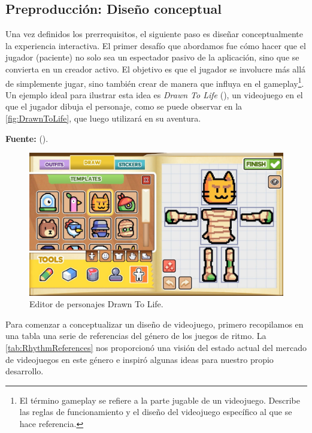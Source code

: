 \subsection{Preproducción: Diseño conceptual}

Una vez definidos los prerrequisitos, el siguiente paso es diseñar conceptualmente la experiencia interactiva. El primer desafío que abordamos fue cómo hacer que el jugador (paciente) no solo sea un espectador pasivo de la aplicación, sino que se convierta en un creador activo. El objetivo es que el jugador se involucre más allá de simplemente jugar, sino también crear de manera que influya en el gameplay\footnote{El término gameplay se refiere a la parte jugable de un videojuego. Describe las reglas de funcionamiento y el diseño del videojuego específico al que se hace referencia.}. Un ejemplo ideal para ilustrar esta idea es \textit{Drawn To Life} (\cite{DTL:2007}), un videojuego en el que el jugador dibuja el personaje, como se puede observar en la \autoref{fig:DrawnToLife}, que luego utilizará en su aventura.

\begin{center}
	\textbf{Fuente:} \citeauthor{DTL:2020} (\citeyear{DTL:2020}).
	\vspace{-16pt}
\end{center}

\begin{figure}[h!]
	\centering
	\includegraphics[width=0.7\linewidth]{Figuras/Desarrollo/DrawnToLife.jpg}
	\caption{Editor de personajes Drawn To Life.}
	\label{fig:DrawnToLife}
\end{figure}

Para comenzar a conceptualizar un diseño de videojuego, primero recopilamos en una tabla una serie de referencias del género de los juegos de ritmo. La \autoref{tab:RhythmReferences} nos proporcionó una visión del estado actual del mercado de videojuegos en este género e inspiró algunas ideas para nuestro propio desarrollo.

